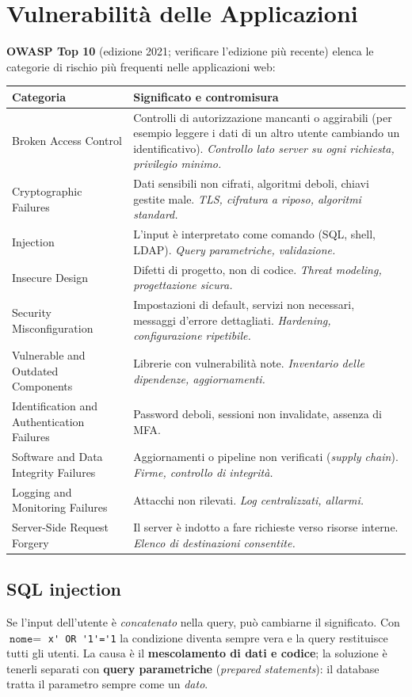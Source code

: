 \section{Vulnerabilità delle Applicazioni}
\textbf{OWASP Top 10} (edizione 2021; verificare l'edizione più recente) elenca le categorie di rischio più frequenti nelle applicazioni web:
\begin{center}
\small
\begin{tabularx}{\textwidth}{@{}>{\raggedright\arraybackslash}p{4.2cm}X@{}}
\toprule
\textbf{Categoria} & \textbf{Significato e contromisura} \\
\midrule
Broken Access Control & Controlli di autorizzazione mancanti o aggirabili (per esempio leggere i dati di un altro utente cambiando un identificativo). \emph{Controllo lato server su ogni richiesta, privilegio minimo.} \\
Cryptographic Failures & Dati sensibili non cifrati, algoritmi deboli, chiavi gestite male. \emph{TLS, cifratura a riposo, algoritmi standard.} \\
Injection & L'input è interpretato come comando (SQL, shell, LDAP). \emph{Query parametriche, validazione.} \\
Insecure Design & Difetti di progetto, non di codice. \emph{Threat modeling, progettazione sicura.} \\
Security Misconfiguration & Impostazioni di default, servizi non necessari, messaggi d'errore dettagliati. \emph{Hardening, configurazione ripetibile.} \\
Vulnerable and Outdated Components & Librerie con vulnerabilità note. \emph{Inventario delle dipendenze, aggiornamenti.} \\
Identification and Authentication Failures & Password deboli, sessioni non invalidate, assenza di MFA. \\
Software and Data Integrity Failures & Aggiornamenti o pipeline non verificati (\emph{supply chain}). \emph{Firme, controllo di integrità.} \\
Logging and Monitoring Failures & Attacchi non rilevati. \emph{Log centralizzati, allarmi.} \\
Server-Side Request Forgery & Il server è indotto a fare richieste verso risorse interne. \emph{Elenco di destinazioni consentite.} \\
\bottomrule
\end{tabularx}
\end{center}

\subsection{SQL injection}
Se l'input dell'utente è \emph{concatenato} nella query, può cambiarne il significato. Con $\texttt{nome} = $ \verb|x' OR '1'='1| la condizione diventa sempre vera e la query restituisce tutti gli utenti. La causa è il \textbf{mescolamento di dati e codice}; la soluzione è tenerli separati con \textbf{query parametriche} (\emph{prepared statements}): il database tratta il parametro sempre come un \emph{dato}.

